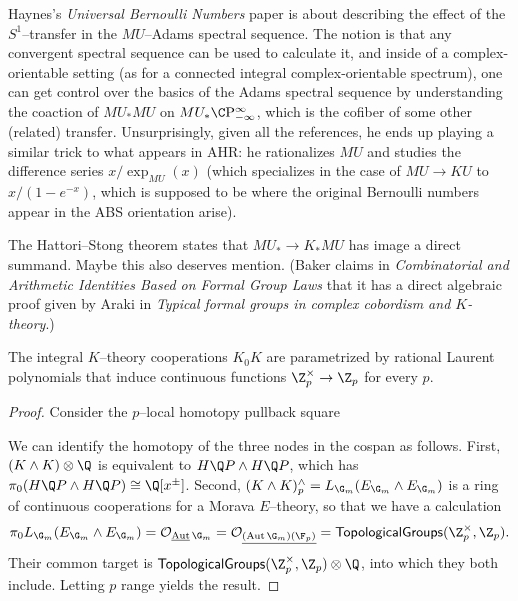 Haynes's \textit{Universal Bernoulli Numbers} paper is about describing the effect of the $S^1$--transfer in the $MU$--Adams spectral sequence.  The notion is that any convergent spectral sequence can be used to calculate it, and inside of a complex-orientable setting (as for a connected integral complex-orientable spectrum), one can get control over the basics of the Adams spectral sequence by understanding the coaction of $MU_* MU$ on $MU_* \CP{}_{-\infty}^{\infty}$, which is the cofiber of some other (related) transfer.  Unsurprisingly, given all the references, he ends up playing a similar trick to what appears in AHR: he rationalizes $MU$ and studies the difference series $x / \exp_{MU}(x)$ (which specializes in the case of $MU \to KU$ to $x / (1 - e^{-x})$, which is supposed to be where the original Bernoulli numbers appear in the ABS orientation arise).

The Hattori--Stong theorem states that $MU_* \to K_* MU$ has image a direct summand.  Maybe this also deserves mention.  (Baker claims in \textit{Combinatorial and Arithmetic Identities Based on Formal Group Laws} that it has a direct algebraic proof given by Araki in \textit{Typical formal groups in complex cobordism and $K$-theory}.)



\begin{theorem}
The integral $K$--theory cooperations $K_0 K$ are parametrized by rational Laurent polynomials that induce continuous functions $\Z_p^\times \to \Z_p$ for every $p$.
\end{theorem}
\begin{proof}
Consider the $p$--local homotopy pullback square
\begin{center}
\end{center}
We can identify the homotopy of the three nodes in the cospan as follows.  First, $(K \sm K) \otimes \Q$ is equivalent to $H\Q P \sm H\Q P$, which has $\pi_0 (H\Q P \sm H\Q P) \cong \Q[x^\pm]$.  Second, $(K \sm K)^\wedge_p = L_{\G_m} (E_{\G_m} \sm E_{\G_m})$ is a ring of continuous cooperations for a Morava $E$--theory, so that we have a calculation \[\pi_0 L_{\G_m} (E_{\G_m} \sm E_{\G_m}) = \sheaf O_{\InternalAut \G_m} = \sheaf O_{\underline{(\Aut \G_m)(\F_p)}} = \CatOf{TopologicalGroups}(\Z_p^\times, \Z_p).\]  Their common target is $\CatOf{TopologicalGroups}(\Z_p^\times, \Z_p) \otimes \Q$, into which they both include.  Letting $p$ range yields the result.
\end{proof}


